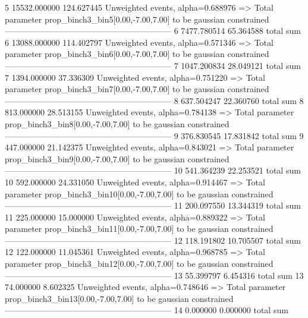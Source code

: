 5          15532.000000    124.627445      Unweighted events, alpha=0.688976
  => Total parameter prop_binch3_bin5[0.00,-7.00,7.00] to be gaussian constrained
------------------------------------------------------------
6          7477.780514     65.364588       total sum                     
6          13088.000000    114.402797      Unweighted events, alpha=0.571346
  => Total parameter prop_binch3_bin6[0.00,-7.00,7.00] to be gaussian constrained
------------------------------------------------------------
7          1047.200834     28.049121       total sum                     
7          1394.000000     37.336309       Unweighted events, alpha=0.751220
  => Total parameter prop_binch3_bin7[0.00,-7.00,7.00] to be gaussian constrained
------------------------------------------------------------
8          637.504247      22.360760       total sum                     
8          813.000000      28.513155       Unweighted events, alpha=0.784138
  => Total parameter prop_binch3_bin8[0.00,-7.00,7.00] to be gaussian constrained
------------------------------------------------------------
9          376.830545      17.831842       total sum                     
9          447.000000      21.142375       Unweighted events, alpha=0.843021
  => Total parameter prop_binch3_bin9[0.00,-7.00,7.00] to be gaussian constrained
------------------------------------------------------------
10         541.364239      22.253521       total sum                     
10         592.000000      24.331050       Unweighted events, alpha=0.914467
  => Total parameter prop_binch3_bin10[0.00,-7.00,7.00] to be gaussian constrained
------------------------------------------------------------
11         200.097550      13.344319       total sum                     
11         225.000000      15.000000       Unweighted events, alpha=0.889322
  => Total parameter prop_binch3_bin11[0.00,-7.00,7.00] to be gaussian constrained
------------------------------------------------------------
12         118.191802      10.705507       total sum                     
12         122.000000      11.045361       Unweighted events, alpha=0.968785
  => Total parameter prop_binch3_bin12[0.00,-7.00,7.00] to be gaussian constrained
------------------------------------------------------------
13         55.399797       6.454316        total sum                     
13         74.000000       8.602325        Unweighted events, alpha=0.748646
  => Total parameter prop_binch3_bin13[0.00,-7.00,7.00] to be gaussian constrained
------------------------------------------------------------
14         0.000000        0.000000        total sum                     
